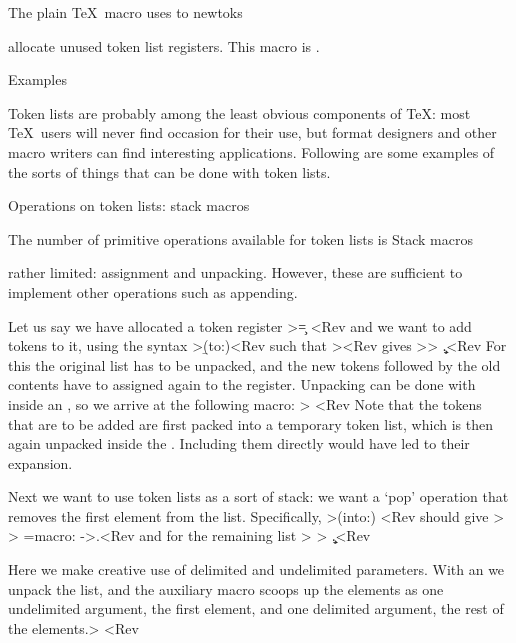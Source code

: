 The plain \TeX\ macro  uses  to 
   \csterm newtoks\par
allocate unused token list registers. This macro is .

\point Examples

Token lists are probably among the least obvious components
of \TeX: most \TeX\ users will never find occasion  for their use,
but format designers and other macro writers
can find interesting applications.
Following are some examples of the sorts of things that can be
done with token lists.

\spoint Operations on token lists: stack macros

The number of primitive operations available for token lists is
\howto Stack macros\par
rather limited: assignment and unpacking. However, these are
sufficient to implement other operations such as appending.

Let us say we have allocated a token register
\Ver>\newtoks\list \list={\c} <Rev
and we want to add tokens to it,
\alt
using the syntax
\Ver>\Prepend \a \b (to:)\list<Rev
such that \Ver>\showthe\list<Rev gives \Ver>> \a \b \c .<Rev
For this the original list has to be unpacked, and 
\alt
the new tokens followed by the old contents have to assigned
again to the register. Unpacking can be done with 
inside an , so we arrive at the following macro:
\Ver>
\def\Prepend#1(to:)#2{\toks0={#1}%
    \edef\act{\noexpand#2={\the\toks0 \the#2}}%
    \act}<Rev
Note that the tokens that are to be added are first packed
\alt
into a temporary token list, which is then again unpacked
inside the . Including them directly would have
led to their expansion.

Next we want to use token lists as a sort of stack:
we want a `pop' operation that removes the first element
from the list. Specifically,
\Ver>\Pop\list(into:)\first
\show\first \showthe\list<Rev
should give
\Ver>
> \first=macro:
->\a .<Rev
and for the remaining list
\Ver> 
> \b \c .<Rev

Here we make creative use of delimited and undelimited
parameters. With an  we unpack the list,
and the auxiliary macro  scoops up the elements
as one undelimited argument, the first element, and one
delimited argument, the rest of the elements.\Ver>
\def\Pop#1(into:)#2{%
    \edef\act{\noexpand\SplitOff\the#1%
              (head:)\noexpand#2(tail:)\noexpand#1}%
    \act}
\def\SplitOff#1#2(head:)#3(tail:)#4{\def#3{#1}#4={#2}}<Rev

